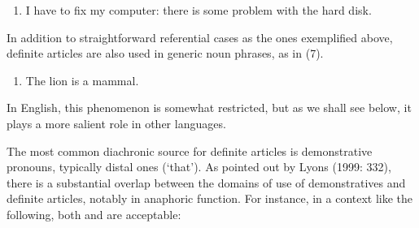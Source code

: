 \begin{enumerate} %
\item 
\label{bkm:Ref75942712}I have to fix my computer: there is some problem with the hard disk. 

\end{enumerate} %
In addition to straightforward referential cases as the ones exemplified above, definite articles are also used in generic noun phrases, as in (7). 

\begin{enumerate} %
\item 
\label{bkm:Ref123549675}The lion is a mammal.

\end{enumerate} %
In English, this phenomenon is somewhat restricted, but as we shall see below, it plays a more salient role in other languages.

The most common diachronic source for definite articles is demonstrative pronouns, typically distal ones (‘that’). As pointed out by Lyons (1999: 332), there is a substantial overlap between the domains of use of demonstratives and definite articles, notably in anaphoric function. For instance, in a context like the following, both  and  are acceptable:

